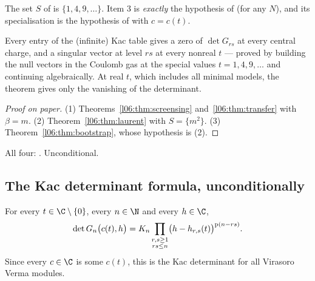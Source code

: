 \begin{dictionary}
The set $S$ of \allowbreak{}\allowbreak{}\allowbreak{} is $\{1,4,9,\dots\}$. Item 3 is \emph{exactly} the
hypothesis  of \allowbreak{}\allowbreak{}\allowbreak{}\allowbreak{}\allowbreak{} (for any $N$), and its specialisation is
the hypothesis of \allowbreak{}\allowbreak{}\allowbreak{}\allowbreak{} with $c = c(t)$.
\end{dictionary}

\begin{physics}
Every entry of the (infinite) Kac table gives a zero of $\det G_{rs}$ at every central charge, and a
singular vector at level $rs$ at every nonreal $t$ --- proved by building the null vectors in the Coulomb gas at
the special values $t = 1,4,9,\dots$ and continuing algebraically. At real $t$, which includes all minimal
models, the theorem gives only the vanishing of the determinant.
\end{physics}

\begin{proof}[Proof on paper]
(1) Theorems~\ref{l06:thm:screensing} and~\ref{l06:thm:transfer} with $\beta = m$. (2) Theorem~\ref{l06:thm:laurent}
with $S = \{m^2\}$. (3) Theorem~\ref{l06:thm:bootstrap}, whose hypothesis is (2).
\end{proof}

\begin{status}
All four: \lean{[propext, Classical.}\allowbreak{}\allowbreak\lean{sound]}. Unconditional.
\end{status}

\subsection{The Kac determinant formula, unconditionally}\label{l06:sec:kacunconditional}

\begin{theorem}\label{l06:thm:kacfull}
For every $t\in\C\setminus\{0\}$, every $n\in\N$ and every $h\in\C$,
\begin{equation*}
 \det G_n\bigl(c(t),h\bigr) = K_n\prod_{\substack{r,s\ge1\\ rs\le n}}\bigl(h-h_{r,s}(t)\bigr)^{\mathrm{p}(n-rs)} .
\end{equation*}
Since every $c\in\C$ is some $c(t)$, this is the Kac determinant for all Virasoro Verma modules.
\end{theorem}


